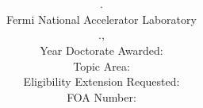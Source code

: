 

\title{\color{NALblue} \bf{\Title}}
\author{\Name. \JobTitle
\\ Fermi National Accelerator Laboratory
\\ \PhoneFirst.\PhoneLast, \EmailFirst\EmailLast
\\Year Doctorate Awarded: \YearPhD
\\ Topic Area: \TopicArea
\\Eligibility Extension Requested: \ExtensionReq
\\FOA Number:  \FOANumber}
